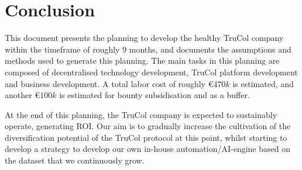 \section{Conclusion}\label{sec:conclusion}
This document presents the planning to develop the healthy TruCol company within the timeframe of roughly 9 months, and documents the assumptions and methods used to generate this planning. The main tasks in this planning are composed of decentralised technology development, TruCol platform development and business development. A total labor cost of roughly \euro$470k$ is estimated, and another \euro$100k$ is estimated for bounty subsidisation and as a buffer.

At the end of this planning, the TruCol company is expected to sustainably operate, generating ROI. Our aim is to gradually increase the cultivation of the diversification potential of the TruCol protocol at this point, whilst starting to develop a strategy to develop our own in-house automation/AI-engine based on the dataset that we continuously grow.